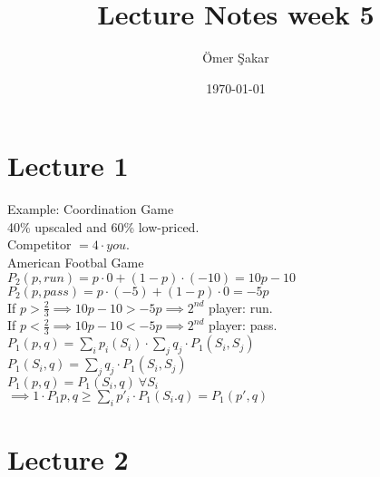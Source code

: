 \documentclass[12pt]{scrartcl}
\title{Lecture Notes week 5}
\author{\"Omer \c Sakar}
\date{\today}
\begin{document}
\maketitle
\tableofcontents
\newpage

\section{Lecture 1}
Example: Coordination Game\\
40\% upscaled and 60\% low-priced.\\
Competitor $= 4 \cdot you$.\\

\noindent American Footbal Game\\
\noindent $P_{2}(p,run) = p\cdot 0 + (1-p)\cdot(-10) = 10p - 10$\\
$P_{2}(p,pass) = p\cdot (-5) + (1-p)\cdot 0 = -5p$\\


\noindent If $p > \frac{2}{3} \implies 10p - 10 > -5p \implies 2^{nd}$ player: run.\\ 
If $p < \frac{2}{3} \implies 10p - 10 < -5p \implies 2^{nd}$ player: pass.\\

\noindent $P_{1}(p,q) = \sum\limits_{i} p_{i}(S_{i})\cdot \sum\limits_{j} q_{j}\cdot P_{1}(S_{i}, S_{j})$\\
$P_{1}(S_{i}, q) = \sum\limits_{j} q_{j}\cdot P_{1}(S_{i}, S_{j})$\\
$P_{1}(p,q) = P_{1}(S_{i}, q)\ \forall S_{i}$\\
$\implies 1\cdot P_{1}p,q \geq \sum\limits_{i} p'_{i}\cdot P_{1}(S_{i}.q) = P_{1}(p',q)$




\clearpage
\section{Lecture 2} 
\end{document}

